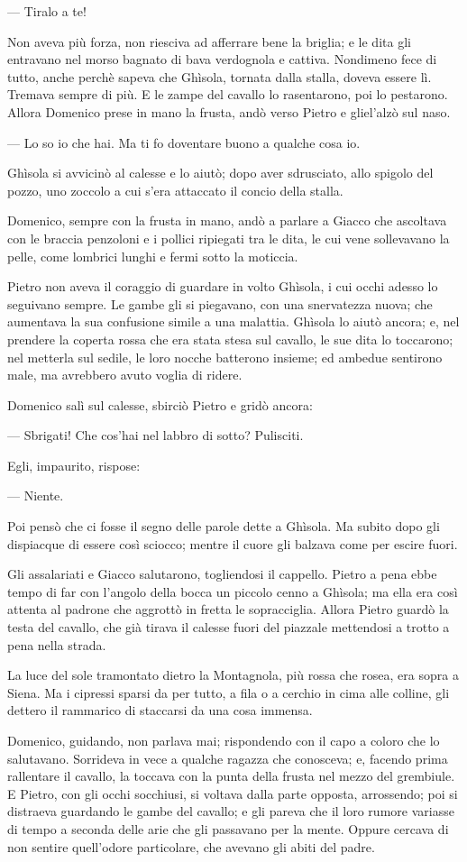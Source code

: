 — Tiralo a te!

Non aveva più forza, non riesciva ad afferrare bene la briglia; e le dita gli entravano nel morso bagnato di bava verdognola e cattiva. Nondimeno fece di tutto, anche perchè sapeva che Ghìsola, tornata dalla stalla, doveva essere lì. Tremava sempre di più. E le zampe del cavallo lo rasentarono, poi lo pestarono. Allora Domenico prese in mano la frusta, andò verso Pietro e gliel'alzò sul naso.

— Lo so io che hai. Ma ti fo doventare buono a qualche cosa io.

Ghìsola si avvicinò al calesse e lo aiutò; dopo aver sdrusciato, allo spigolo del pozzo, uno zoccolo a cui s'era attaccato il concio della stalla.

Domenico, sempre con la frusta in mano, andò a parlare a Giacco che ascoltava con le braccia penzoloni e i pollici ripiegati tra le dita, le cui vene sollevavano la pelle, come lombrici lunghi e fermi sotto la moticcia.

Pietro non aveva il coraggio di guardare in volto Ghìsola, i cui occhi adesso lo seguivano sempre. Le gambe gli si piegavano, con una snervatezza nuova; che aumentava la sua confusione simile a una malattia. Ghìsola lo aiutò ancora; e, nel prendere la coperta rossa che era stata stesa sul cavallo, le sue dita lo toccarono; nel metterla sul sedile, le loro nocche batterono insieme; ed ambedue sentirono male, ma avrebbero avuto voglia di ridere.

Domenico salì sul calesse, sbirciò Pietro e gridò ancora:

— Sbrigati! Che cos'hai nel labbro di sotto? Pulisciti.

Egli, impaurito, rispose:

— Niente.

Poi pensò che ci fosse il segno delle parole dette a Ghìsola. Ma subito dopo gli dispiacque di essere così sciocco; mentre il cuore gli balzava come per escire fuori.

Gli assalariati e Giacco salutarono, togliendosi il cappello. Pietro a pena ebbe tempo di far con l'angolo della bocca un piccolo cenno a Ghìsola; ma ella era così attenta al padrone che aggrottò in fretta le sopracciglia. Allora Pietro guardò la testa del cavallo, che già tirava il calesse fuori del piazzale mettendosi a trotto a pena nella strada.

La luce del sole tramontato dietro la Montagnola, più rossa che rosea, era sopra a Siena. Ma i cipressi sparsi da per tutto, a fila o a cerchio in cima alle colline, gli dettero il rammarico di staccarsi da una cosa immensa.

Domenico, guidando, non parlava mai; rispondendo con il capo a coloro che lo salutavano. Sorrideva in vece a qualche ragazza che conosceva; e, facendo prima rallentare il cavallo, la toccava con la punta della frusta nel mezzo del grembiule. E Pietro, con gli occhi socchiusi, si voltava dalla parte opposta, arrossendo; poi si distraeva guardando le gambe del cavallo; e gli pareva che il loro rumore variasse di tempo a seconda delle arie che gli passavano per la mente. Oppure cercava di non sentire quell'odore particolare, che avevano gli abiti del padre.
